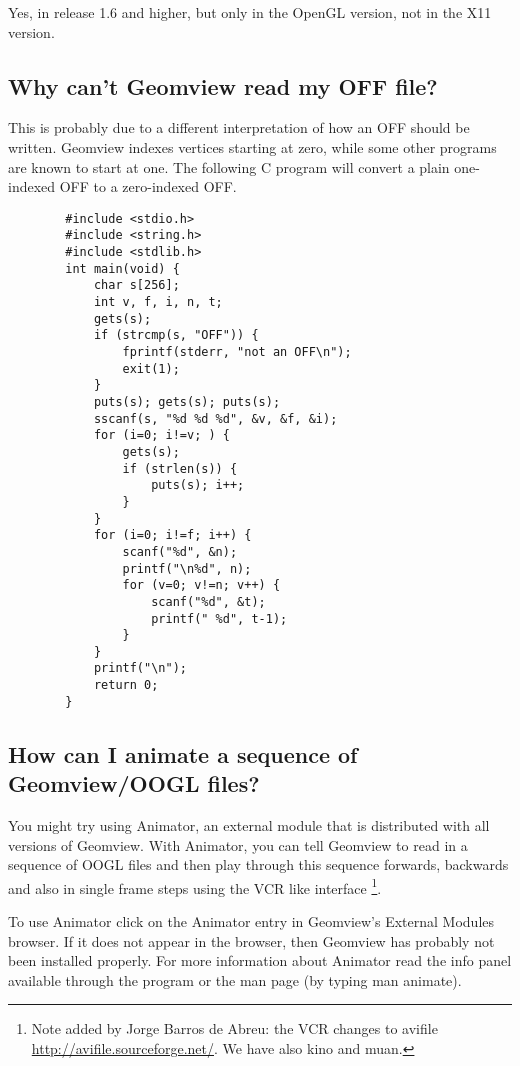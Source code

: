 \documentclass[12pt,a4paper]{article}
\begin{document}
        Yes, in release 1.6 and higher, but only in the OpenGL version, not in
        the X11 version.

    \subsection{Why can't Geomview read my OFF file?}

        This is probably due to a different interpretation of how an OFF should
        be written. Geomview indexes vertices starting at zero, while some other
        programs are known to start at one. The following C program will convert
        a plain one-indexed OFF to a zero-indexed OFF.
        \begin{verbatim}
        #include <stdio.h>
        #include <string.h>
        #include <stdlib.h>
        int main(void) {
            char s[256];
            int v, f, i, n, t;
            gets(s);
            if (strcmp(s, "OFF")) {
                fprintf(stderr, "not an OFF\n");
                exit(1);
            }
            puts(s); gets(s); puts(s);
            sscanf(s, "%d %d %d", &v, &f, &i);
            for (i=0; i!=v; ) {
                gets(s);
                if (strlen(s)) {
                    puts(s); i++;
                }
            }
            for (i=0; i!=f; i++) {
                scanf("%d", &n);
                printf("\n%d", n);
                for (v=0; v!=n; v++) {
                    scanf("%d", &t);
                    printf(" %d", t-1);
                }
            }
            printf("\n");
            return 0;
        }
        \end{verbatim}

    \subsection{How can I animate a sequence of Geomview/OOGL files?}

        You might try using Animator, an external module that is distributed
        with all versions of Geomview. With Animator, you can tell Geomview to
        read in a sequence of OOGL files and then play through this sequence
        forwards, backwards and also in single frame steps using the VCR like
        interface \footnote{Note added by Jorge Barros de Abreu: the VCR
        changes to avifile \url{http://avifile.sourceforge.net/}. We have also kino and muan.}.

        To use Animator click on the Animator entry in Geomview's External
        Modules browser. If it does not appear in the browser, then Geomview has
        probably not been installed properly. For more information about
        Animator read the info panel available through the program or the
        man page (by typing man animate).
\end{document}
